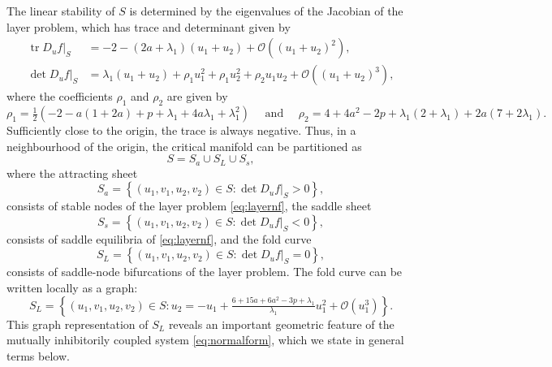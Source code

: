 \documentclass[10pt,onecolumn]{article}
\theoremstyle{plain}
\newtheorem{lemma}{Lemma}[section]
\begin{document}
The linear stability of $S$ is determined by the eigenvalues of the Jacobian of the layer problem, which has trace and determinant given by 
%
\begin{equation*}
  \begin{split}
    \left. \operatorname{tr} D_u f \right|_S &= -2 -\left(2a+\lambda_1\right) (u_1+u_2) + \mathcal{O}((u_1+u_2)^2), \\ 
    \left. \det D_u f \right|_{S} &= \lambda_1 (u_1+u_2) + \rho_1 u_1^2 + \rho_1 u_2^2 + \rho_2 u_1 u_2 + \mathcal{O}((u_1+u_2)^3),
  \end{split}
\end{equation*}
%
where the coefficients $\rho_1$ and $\rho_2$ are given by 
%
\[ \rho_1 = \tfrac{1}{2} \left( -2-a(1+2a)+p+\lambda_1+4a \lambda_1+\lambda_1^2 \right) \quad \text{ and } \quad \rho_2 = 4+4a^2-2p+\lambda_1(2+\lambda_1)+2a(7+2\lambda_1). \]
%
Sufficiently close to the origin, the trace is always negative. Thus, in a neighbourhood of the origin, the critical manifold can be partitioned as
%
\[ S = S_a \cup S_L \cup S_s, \]
%
where the attracting sheet
%
\[ S_a = \left\{ \left. (u_1,v_1,u_2,v_2) \in S : \det D_u f \right|_{S} > 0 \right\}, \] 
%
consists of stable nodes of the layer problem \eqref{eq:layernf}, the saddle sheet 
%
\[ S_s = \left\{ \left. (u_1,v_1,u_2,v_2) \in S : \det D_u f \right|_{S} < 0 \right\}, \]
%
consists of saddle equilibria of \eqref{eq:layernf}, and the fold curve
%
\[ S_L = \left\{ \left. (u_1,v_1,u_2,v_2) \in S : \det D_u f \right|_{S} = 0 \right\}, \] 
%
consists of saddle-node bifurcations of the layer problem. The fold curve can be written locally as a graph:
%
\begin{equation}  \label{eq:foldcurvegraph}
S_L = \left\{ (u_1,v_1,u_2,v_2) \in S : u_2 = -u_1 + \tfrac{6+15a+6a^2-3p+\lambda_1}{\lambda_1}u_1^2 + \mathcal O \left( u_1^3 \right) \right\}.
\end{equation}
%
This graph representation of $S_L$ reveals an important geometric feature of the mutually inhibitorily coupled system \eqref{eq:normalform}, which we state in general terms below.

\medskip
\end{document}
